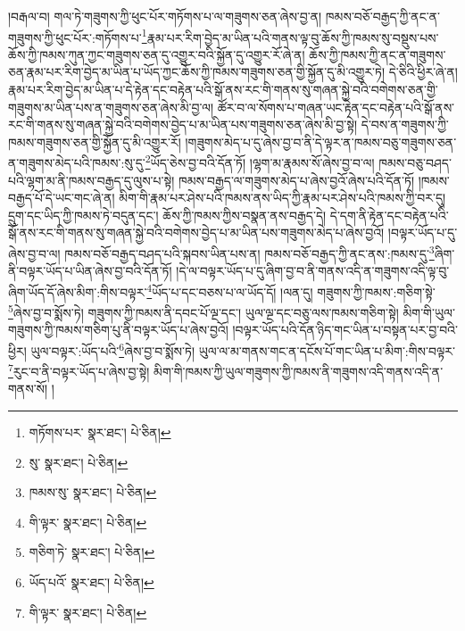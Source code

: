 །བརྒལ་བ། གལ་ཏེ་གཟུགས་ཀྱི་ཕུང་པོར་གཏོགས་པ་ལ་གཟུགས་ཅན་ཞེས་བྱ་ན། ཁམས་བཅོ་བརྒྱད་ཀྱི་ནང་ན་གཟུགས་ཀྱི་ཕུང་པོར་:གཏོགས་པ་\footnote{གཏོགས་པར་  སྣར་ཐང་།  པེ་ཅིན། }རྣམ་པར་རིག་བྱེད་མ་ཡིན་པའི་གནས་ལྟ་བུ་ཆོས་ཀྱི་ཁམས་སུ་བསྡུས་པས་ཆོས་ཀྱི་ཁམས་ཀུན་ཀྱང་གཟུགས་ཅན་དུ་འགྱུར་བའི་སྐྱོན་དུ་འགྱུར་རོ་ཞེ་ན། ཆོས་ཀྱི་ཁམས་ཀྱི་ནང་ན་གཟུགས་ཅན་རྣམ་པར་རིག་བྱེད་མ་ཡིན་པ་ཡོད་ཀྱང་ཆོས་ཀྱི་ཁམས་གཟུགས་ཅན་གྱི་སྐྱོན་དུ་མི་འགྱུར་ཏེ། དེ་ཅིའི་ཕྱིར་ཞེ་ན། རྣམ་པར་རིག་བྱེད་མ་ཡིན་པ་དེ་རྟེན་དང་བརྟེན་པའི་སྒོ་ནས་རང་གི་གནས་སུ་གཞན་སྐྱེ་བའི་བགེགས་ཅན་གྱི་གཟུགས་མ་ཡིན་པས་ན་གཟུགས་ཅན་ཞེས་མི་བྱ་ལ། ཚོར་བ་ལ་སོགས་པ་གཞན་ཡང་རྟེན་དང་བརྟེན་པའི་སྒོ་ནས་རང་གི་གནས་སུ་གཞན་སྐྱེ་བའི་བགེགས་བྱེད་པ་མ་ཡིན་པས་གཟུགས་ཅན་ཞེས་མི་བྱ་སྟེ། དེ་བས་ན་གཟུགས་ཀྱི་ཁམས་གཟུགས་ཅན་གྱི་སྐྱོན་དུ་མི་འགྱུར་རོ། །གཟུགས་མེད་པ་དུ་ཞེས་བྱ་བ་ནི་དེ་ལྟར་ན་ཁམས་བཅུ་གཟུགས་ཅན་ན་གཟུགས་མེད་པའི་ཁམས་:སུ་དུ་\footnote{སུ་  སྣར་ཐང་།  པེ་ཅིན། }ཡོད་ཅེས་བྱ་བའི་དོན་ཏོ། །ལྷག་མ་རྣམས་སོ་ཞེས་བྱ་བ་ལ། ཁམས་བཅུ་བཤད་པའི་ལྷག་མ་ནི་ཁམས་བརྒྱད་དུ་ལུས་པ་སྟེ། ཁམས་བརྒྱད་ལ་གཟུགས་མེད་པ་ཞེས་བྱའོ་ཞེས་པའི་དོན་ཏོ། །ཁམས་བརྒྱད་པོ་དེ་ཡང་གང་ཞེ་ན། མིག་གི་རྣམ་པར་ཤེས་པའི་ཁམས་ནས་ཡིད་ཀྱི་རྣམ་པར་ཤེས་པའི་ཁམས་ཀྱི་བར་དུ། དྲུག་དང་ཡིད་ཀྱི་ཁམས་ཏེ་བདུན་དང་། ཆོས་ཀྱི་ཁམས་ཀྱིས་བསྣན་ནས་བརྒྱད་དེ། དེ་དག་ནི་རྟེན་དང་བརྟེན་པའི་སྒོ་ནས་རང་གི་གནས་སུ་གཞན་སྐྱེ་བའི་བགེགས་བྱེད་པ་མ་ཡིན་པས་གཟུགས་མེད་པ་ཞེས་བྱའོ། །བལྟར་ཡོད་པ་དུ་ཞེས་བྱ་བ་ལ། ཁམས་བཅོ་བརྒྱད་བཤད་པའི་སྐབས་ཡིན་པས་ན། ཁམས་བཅོ་བརྒྱད་ཀྱི་ནང་ནས་:ཁམས་དུ་\footnote{ཁམས་སུ་  སྣར་ཐང་།  པེ་ཅིན། }ཞིག་ནི་བལྟར་ཡོད་པ་ཡིན་ཞེས་བྱ་བའི་དོན་ཏོ། །དེ་ལ་བལྟར་ཡོད་པ་དུ་ཞིག་བྱ་བ་ནི་གནས་འདི་ན་གཟུགས་འདི་ལྟ་བུ་ཞིག་ཡོད་དོ་ཞེས་མིག་:གིས་བལྟར་\footnote{གི་ལྟར་  སྣར་ཐང་།  པེ་ཅིན། }ཡོད་པ་དང་བཅས་པ་ལ་ཡོད་དོ། །ལན་དུ། གཟུགས་ཀྱི་ཁམས་:གཅིག་སྟེ་\footnote{གཅིག་ཏེ་  སྣར་ཐང་།  པེ་ཅིན། }ཞེས་བྱ་བ་སྨོས་ཏེ། གཟུགས་ཀྱི་ཁམས་ནི་དབང་པོ་ལྔ་དང་། ཡུལ་ལྔ་དང་བཅུ་ལས་ཁམས་གཅིག་སྟེ། མིག་གི་ཡུལ་གཟུགས་ཀྱི་ཁམས་གཅིག་པུ་ནི་བལྟར་ཡོད་པ་ཞེས་བྱའོ། །བལྟར་ཡོད་པའི་དོན་ཉིད་གང་ཡིན་པ་བསྟན་པར་བྱ་བའི་ཕྱིར། ཡུལ་བལྟར་:ཡོད་པའི་\footnote{ཡོད་པའོ་  སྣར་ཐང་།  པེ་ཅིན། }ཞེས་བྱ་བ་སྨོས་ཏེ། ཡུལ་ལ་མ་གནས་གང་ན་དངོས་པོ་གང་ཡིན་པ་མིག་:གིས་བལྟར་\footnote{གི་ལྟར་  སྣར་ཐང་།  པེ་ཅིན། }རུང་བ་ནི་བལྟར་ཡོད་པ་ཞེས་བྱ་སྟེ། མིག་གི་ཁམས་ཀྱི་ཡུལ་གཟུགས་ཀྱི་ཁམས་ནི་གཟུགས་འདི་གནས་འདི་ན་གནས་སོ། །
